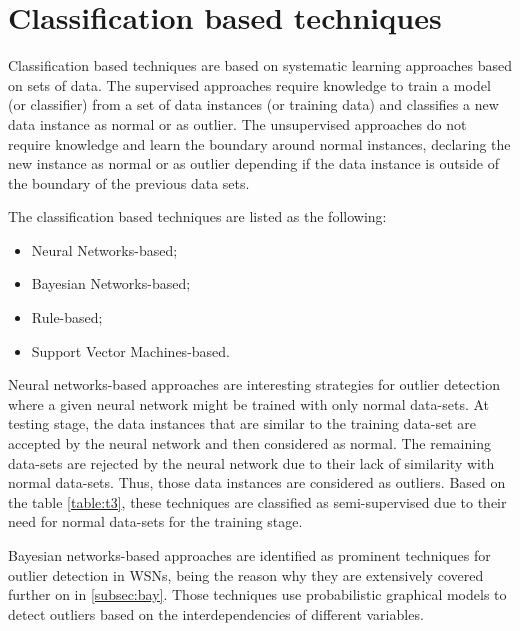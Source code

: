 
\newpage

\section{Classification based techniques}
\label{sec:classbased}

Classification based techniques are based on systematic learning approaches based on sets of data. 
The supervised approaches require knowledge to train a model (or classifier) from a set of data instances (or training data) and classifies a new data instance as normal or as outlier. 
The unsupervised approaches do not require knowledge and learn the boundary around normal instances, declaring the new instance as normal or as outlier depending if the data instance is outside of the boundary of the previous data sets.

The classification based techniques are listed as the following:

\begin{itemize}
	\setlength\itemsep{-0.5em}
	\item Neural Networks-based;
	\item Bayesian Networks-based;
	\item Rule-based;
	\item Support Vector Machines-based.
	
\end{itemize}

\vspace{0.5em}

Neural networks-based approaches are interesting strategies for outlier detection where a given neural network might be trained with only normal data-sets. 
At testing stage, the data instances that are similar to the training data-set are accepted by the neural network and then considered as normal. 
The remaining data-sets are rejected by the neural network due to their lack of similarity with normal data-sets. Thus, those data instances are considered as outliers. 
Based on the table \ref{table:t3}, these techniques are classified as semi-supervised due to their need for normal data-sets for the training stage.

\vspace{0.5em}

Bayesian networks-based approaches are identified as prominent techniques for outlier detection in WSNs, being the reason why they are extensively covered further on in \ref{subsec:bay}.
Those techniques use probabilistic graphical models to detect outliers based on the interdependencies of different variables.

